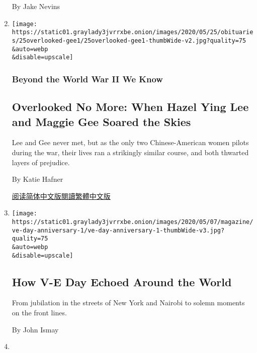 \begin{enumerate}
  By Jake Nevins
\item
  \href{/2020/05/21/obituaries/hazel-ying-lee-and-maggie-gee-overlooked.html}{}

  \texttt{[image: https://static01.graylady3jvrrxbe.onion/images/2020/05/25/obituaries/25overlooked-gee1/25overlooked-gee1-thumbWide-v2.jpg?quality=75\\\&auto=webp\\\&disable=upscale]}

  \hypertarget{beyond-the-world-war-ii-we-know-10}{%
  \subsubsection{Beyond the World War II We
  Know}\label{beyond-the-world-war-ii-we-know-10}}

  \hypertarget{overlooked-no-more-when-hazel-ying-lee-and-maggie-gee-soared-the-skies}{%
  \subsection{Overlooked No More: When Hazel Ying Lee and Maggie Gee
  Soared the
  Skies}\label{overlooked-no-more-when-hazel-ying-lee-and-maggie-gee-soared-the-skies}}

  Lee and Gee never met, but as the only two Chinese-American women
  pilots during the war, their lives ran a strikingly similar course,
  and both thwarted layers of prejudice.

  By Katie Hafner

  \href{https://cn.nytimes3xbfgragh.onion/obits/20200526/hazel-ying-lee-and-maggie-gee-overlooked/}{阅读简体中文版}\href{https://cn.nytimes3xbfgragh.onion/obits/20200526/hazel-ying-lee-and-maggie-gee-overlooked/zh-}{閱讀繁體中文版}
\item
  \href{/interactive/2020/05/07/magazine/ve-day-anniversary.html}{}

  \texttt{[image: https://static01.graylady3jvrrxbe.onion/images/2020/05/07/magazine/ve-day-anniversary-1/ve-day-anniversary-1-thumbWide-v3.jpg?quality=75\\\&auto=webp\\\&disable=upscale]}

  \hypertarget{how-v-e-day-echoed-around-the-world}{%
  \subsection{How V-E Day Echoed Around the
  World}\label{how-v-e-day-echoed-around-the-world}}

  From jubilation in the streets of New York and Nairobi to solemn
  moments on the front lines.

  By John Ismay
\item
  \href{/2020/05/04/nyregion/holocaust-survivors-coronavirus.html}{}


\end{enumerate}
